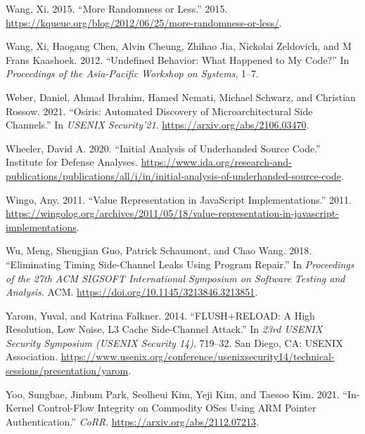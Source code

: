 \documentclass[
  a4paper,
]{report}
\newlength{\cslhangindent}
\newenvironment{CSLReferences}[2] %
{\begin{list}{}{%
	\setlength{\itemindent}{0pt}
	\setlength{\leftmargin}{0pt}
	\setlength{\parsep}{0pt}
	\ifodd #1
	\setlength{\leftmargin}{\cslhangindent}
	\setlength{\itemindent}{-1\cslhangindent}
	\fi
	\setlength{\itemsep}{#2\baselineskip}}}
{\end{list}}
\begin{document}
\begin{CSLReferences}{1}{0}
Wang, Xi. 2015. {``More Randomness or Less.''} 2015.
\url{https://kqueue.org/blog/2012/06/25/more-randomness-or-less/}.

Wang, Xi, Haogang Chen, Alvin Cheung, Zhihao Jia, Nickolai Zeldovich,
and M Frans Kaashoek. 2012. {``Undefined Behavior: What Happened to My
Code?''} In \emph{Proceedings of the Asia-Pacific Workshop on Systems},
1--7.

Weber, Daniel, Ahmad Ibrahim, Hamed Nemati, Michael Schwarz, and
Christian Rossow. 2021. {``Osiris: Automated Discovery of
Microarchitectural Side Channels.''} In \emph{USENIX Security'21}.
\url{https://arxiv.org/abs/2106.03470}.

Wheeler, David A. 2020. {``Initial Analysis of Underhanded Source
Code.''} Institute for Defense Analyses.
\url{https://www.ida.org/research-and-publications/publications/all/i/in/initial-analysis-of-underhanded-source-code}.

Wingo, Any. 2011. {``Value Representation in JavaScript
Implementations.''} 2011.
\url{https://wingolog.org/archives/2011/05/18/value-representation-in-javascript-implementations}.

Wu, Meng, Shengjian Guo, Patrick Schaumont, and Chao Wang. 2018.
{``Eliminating Timing Side-Channel Leaks Using Program Repair.''} In
\emph{Proceedings of the 27th {ACM} {SIGSOFT} International Symposium on
Software Testing and Analysis}. {ACM}.
\url{https://doi.org/10.1145/3213846.3213851}.

Yarom, Yuval, and Katrina Falkner. 2014. {``{FLUSH+RELOAD}: A High
Resolution, Low Noise, L3 Cache {Side-Channel} Attack.''} In \emph{23rd
USENIX Security Symposium (USENIX Security 14)}, 719--32. San Diego, CA:
USENIX Association.
\url{https://www.usenix.org/conference/usenixsecurity14/technical-sessions/presentation/yarom}.

Yoo, Sungbae, Jinbum Park, Seolheui Kim, Yeji Kim, and Taesoo Kim. 2021.
{``In-Kernel Control-Flow Integrity on Commodity OSes Using {ARM}
Pointer Authentication.''} \emph{CoRR}.
\url{https://arxiv.org/abs/2112.07213}.

\end{CSLReferences}
\end{document}
